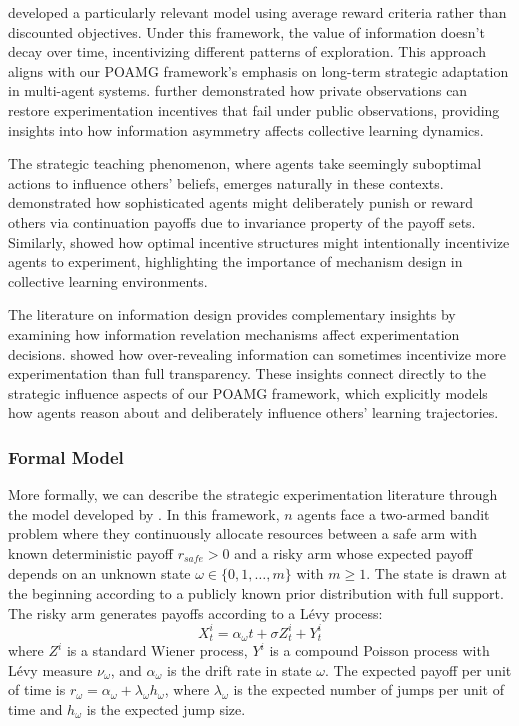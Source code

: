 \citet{keller2020undiscounted} developed a particularly relevant model using average reward criteria rather than discounted objectives. Under this framework, the value of information doesn't decay over time, incentivizing different patterns of exploration. This approach aligns with our POAMG framework's emphasis on long-term strategic adaptation in multi-agent systems. \citet{heidhues2015strategic} further demonstrated how private observations can restore experimentation incentives that fail under public observations, providing insights into how information asymmetry affects collective learning dynamics.

The strategic teaching phenomenon, where agents take seemingly suboptimal actions to influence others' beliefs, emerges naturally in these contexts. \citet{yamamoto2019stochastic} demonstrated how sophisticated agents might deliberately punish or reward others via continuation payoffs due to invariance property of the payoff sets. Similarly, \citet{halac2017designing} showed how optimal incentive structures might intentionally incentivize agents to experiment, highlighting the importance of mechanism design in collective learning environments.


The literature on information design \citep{kamenica2011bayesian, bergemann2019information} provides complementary insights by examining how information revelation mechanisms affect experimentation decisions. \citet{che2018optimal} showed how over-revealing information can sometimes incentivize more experimentation than full transparency. These insights connect directly to the strategic influence aspects of our POAMG framework, which explicitly models how agents reason about and deliberately influence others' learning trajectories.

\subsubsection{Formal Model}
More formally, we can describe the strategic experimentation literature through the model developed by \citet{keller2020undiscounted}. In this framework, $n$ agents face a two-armed bandit problem where they continuously allocate resources between a safe arm with known deterministic payoff $r_\textit{safe} > 0$ and a risky arm whose expected payoff depends on an unknown state $\omega \in \{0,1,\ldots,m\}$ with $m \geq 1$. The state is drawn at the beginning according to a publicly known prior distribution with full support. The risky arm generates payoffs according to a Lévy process:
\begin{equation*}
    X^i_t = \alpha_{\omega} t + \sigma Z^i_t + Y^i_t
\end{equation*}
where $Z^i$ is a standard Wiener process, $Y^i$ is a compound Poisson process with Lévy measure $\nu_{\omega}$, and $\alpha_{\omega}$ is the drift rate in state $\omega$. The expected payoff per unit of time is $r_{\omega} = \alpha_{\omega} + \lambda_{\omega} h_{\omega}$, where $\lambda_{\omega}$ is the expected number of jumps per unit of time and $h_{\omega}$ is the expected jump size.

